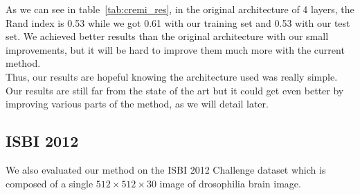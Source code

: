 As we can see in table~\ref{tab:cremi_res}, in the original architecture of 4 layers, 
the Rand index is 0.53 while we got 0.61 with our training set and 0.53 with our test set.
We achieved better results than the original architecture with our small
improvements, but it will be hard to improve them much more with the current
method.\\

Thus, our results are hopeful knowing the architecture used was really simple.\\ 
Our results are still far from the state of the art but it could get even
better by improving various parts of the method, as we will detail later.\\

\subsection{ISBI 2012}

We also evaluated our method on the ISBI 2012 Challenge dataset
which is composed of a single $512\times512\times30$ image of drosophilia brain
image.\\

